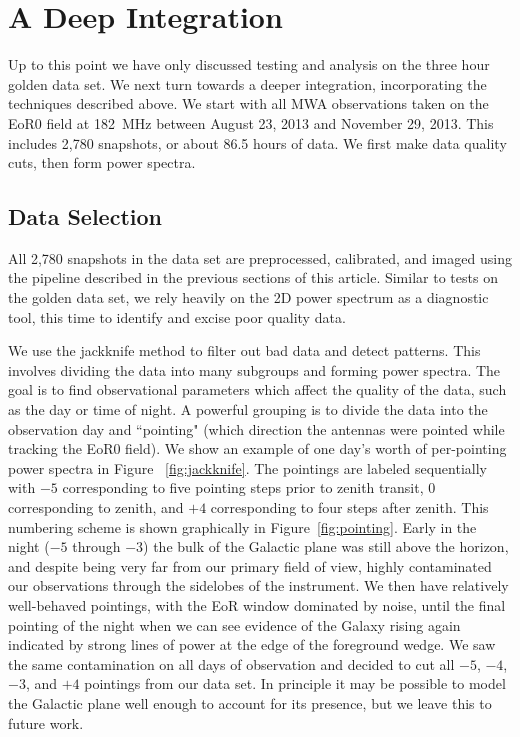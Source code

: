 \documentclass[iop]{emulateapj}
\begin{document}
\section{A Deep Integration}\label{sec:deep}
Up to this point we have only discussed testing and analysis on the three hour golden data 
set. We next turn towards a deeper integration, incorporating the techniques described above. 
We start with all MWA observations taken on the EoR0 field at 182~MHz between August 
23, 2013 and November 29, 2013. This includes 2,780 snapshots, or about 86.5 hours of 
data. We first make data quality cuts, then form power spectra.

\subsection{Data Selection}\label{sec:selection}
All 2,780 snapshots in the data set are preprocessed, calibrated, and imaged using the 
pipeline described in the previous sections of this article. Similar to tests on the golden data 
set, we rely heavily on the 2D power spectrum as a diagnostic tool, this time to identify and 
excise poor quality data.

We use the jackknife method to filter out bad data and detect patterns. This involves dividing
the data into many subgroups and forming power spectra. The goal is to find observational
parameters which affect the quality of the data, such as the day or time of night.
A powerful grouping is to divide the data into the observation day 
and ``pointing" (which direction the antennas were pointed while tracking the EoR0 field). 
We show an example of one day's worth of per-pointing power spectra in Figure~
\ref{fig:jackknife}. The pointings are labeled sequentially with $-5$ corresponding to five 
pointing steps prior to zenith transit, $0$ corresponding to zenith, and $+4$ corresponding 
to four steps after zenith. 
This numbering scheme is shown graphically in Figure~\ref{fig:pointing}.
Early in the night ($-5$ through $-3$) the bulk of the Galactic plane 
was still above the horizon, and despite being very far from our primary field of view, highly 
contaminated our observations through the sidelobes of the instrument. We then have 
relatively well-behaved pointings, with the EoR window dominated by noise, until the final 
pointing of the night when we can see evidence of the Galaxy rising again indicated by 
strong lines of power at the edge of the foreground wedge. We saw the same contamination 
on all days of observation and decided to cut all $-5$, $-4$, $-3$, and $+4$ pointings from 
our data set. In principle it may be possible to model the Galactic plane well enough to 
account for its presence, but we leave this to future work.
\end{document}
